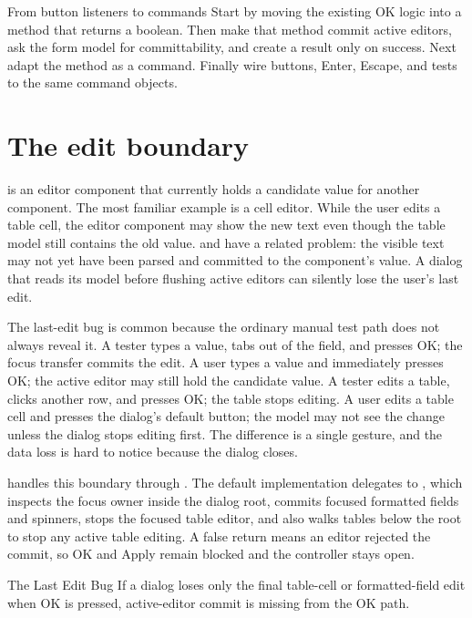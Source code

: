 \begin{migrationbox}{From button listeners to commands}
Start by moving the existing OK logic into a method that returns a boolean.
Then make that method commit active editors, ask the form model for
committability, and create a result only on success. Next adapt the method as a
 command. Finally wire buttons, Enter, Escape, and tests to the
same command objects.
\end{migrationbox}

\section{The edit boundary}

 is an editor component that currently holds a
candidate value for another component. The most familiar example is a
 cell editor. While the user edits a table cell, the editor
component may show the new text even though the table model still contains the
old value.  and  have a related problem:
the visible text may not yet have been parsed and committed to the component's
value. A dialog that reads its model before flushing active editors can silently
lose the user's last edit.

The last-edit bug is common because the ordinary manual test path does not
always reveal it. A tester types a value, tabs out of the field, and presses
OK; the focus transfer commits the edit. A user types a value and immediately
presses OK; the active editor may still hold the candidate value. A tester
edits a table, clicks another row, and presses OK; the table stops editing. A
user edits a table cell and presses the dialog's default button; the model may
not see the change unless the dialog stops editing first. The difference is a
single gesture, and the data loss is hard to notice because the dialog closes.

 handles this boundary through . The
default implementation delegates to ,
which inspects the focus owner inside the dialog root, commits focused
formatted fields and spinners, stops the focused table editor, and also walks
tables below the root to stop any active table editing. A false return means an
editor rejected the commit, so OK and Apply remain blocked and the controller
stays open.

\begin{pitfallbox}{The Last Edit Bug}
If a dialog loses only the final table-cell or formatted-field edit when OK is
pressed, active-editor commit is missing from the OK path.
\end{pitfallbox}

